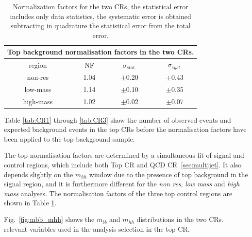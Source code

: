 \begin{table}
\begin{center}
\begin{tabular}{c|c|c|c}
\multicolumn{4}{c}{Top background normalisation factors in the two
  CRs.} \\
\hline
region & NF & $\sigma_{stat.}$ & $\sigma_{syst.}$ \\
\hline
non-res   & 1.04  &  $\pm$0.20  &  $\pm$0.43\\
low-mass  & 1.14  &  $\pm$0.10  &  $\pm$0.35\\
high-mass & 1.02  &  $\pm$0.02  &  $\pm$0.07\\
\hline
\end{tabular}
\caption[Normalization factors for the two CRs]{Normalization factors for the two CRs, the statistical error
  includes only data statistics, the systematic error is obtained
  subtracting in quadrature the statistical error from the total error.} \label{tab:NFs}
\end{center}
\end{table}

Table \ref{tab:CR1} through \ref{tab:CR3} show the number of observed
events and expected background events in the top CRs before the
normalisation factors have been applied to the top background sample.

The top normalisation factors are determined by a simultaneous fit  of
signal and control regions, which include both Top CR and QCD CR~\ref{sec:multijet}. It also depends slightly on the $m_{hh}$ window due to the presence of top background in the signal region, and it is furthermore different for the \emph{non  res}, \emph{low  mass} and \emph{high mass} analyses. The normalisation
factors of the three top control regions are shown in Table \ref{tab:NFs}.

Fig.~\ref{fig:mbb_mhh} shows the $m_{bb}$ and $m_{hh}$ distributions in the two CRs.%
relevant variables used in the analysis selection in the top CR.  


